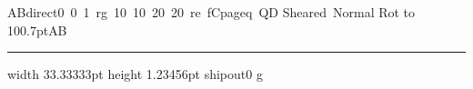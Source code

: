  
\hbox{AB\pdfliteral direct{0 0 1 rg 10 10 20 20 re f}C\pdfliteral page{q Q}D}
\hbox{\pdfsave{}Sheared\pdfrestore\ Normal}
\hbox{\pdfsave{}Rot\pdfrestore}
 \hbox to 100.7pt{A\hfil B}
 \hrule width 33.33333pt height 1.23456pt
\pdfliteral shipout{0 g}
\bye
